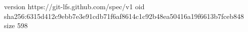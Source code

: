 version https://git-lfs.github.com/spec/v1
oid sha256:6315d412c9ebb7e3e91cdb71f6af8614c1c92b48ea50416a19f6613b7fceb848
size 598
